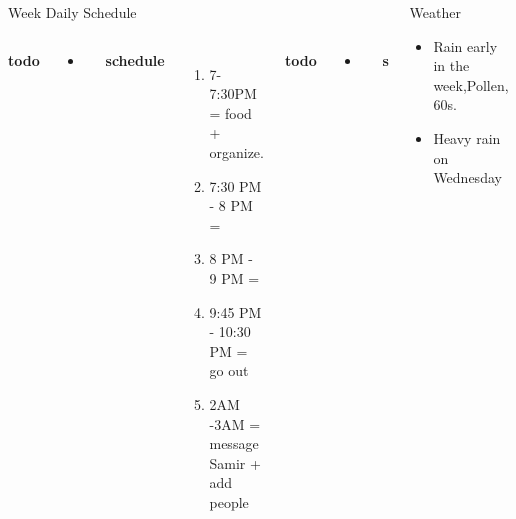 \documentclass[serif, mathserif, final]{beamer}
\begin{document}
\begin{frame}
\begin{columns}
\begin{column}{0.5\linewidth}
\begin{block}{Week Daily Schedule}
\begin{columns}
          \textbf{\small todo}\\
          \begin{itemize} 
            \tiny \item \tiny
          \end{itemize}
          \textbf{\small schedule}\\ 
          \begin{enumerate}
            \tiny \item \tiny 7-7:30PM = food + organize.  
            \tiny \item \tiny 7:30 PM - 8 PM = 
            \tiny \item \tiny 8 PM - 9 PM = 
            \tiny \item \tiny 9:45 PM - 10:30 PM = go out 
            \tiny \item \tiny 2AM -3AM =  message Samir + add people
          \end{enumerate}
         

          \textbf{\small todo}\\
          \begin{itemize} 
           \tiny \item \tiny 
          \end{itemize}

          \textbf{\small schedule}\\
          \begin{enumerate} 
            \tiny \item \tiny 3PM - 4PM =  . 
          \item \tiny 5-7PM = Comm work. 
          \item \tiny 8PM - 10PM = worklife work. 
          \end{enumerate} 
        \end{columns}
      \end{block}
    \end{column}%



\begin{column}{0.25\linewidth}


      \begin{block}{Weather}
        \begin{itemize}
          \tiny \item \tiny Rain early in the week,Pollen, 60s.
          \tiny \item \tiny Heavy rain on Wednesday 
        \end{itemize}
      \end{block}


\end{column}
\end{columns}
\end{frame}
\end{document}
